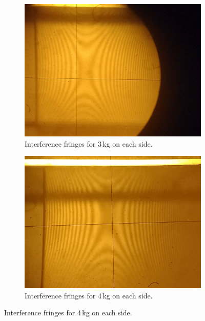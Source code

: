 \documentclass[a4paper,11pt]{article}
\begin{document}
\begin{figure}[H]
  \centering
  \begin{subfigure}[b]{0.45\textwidth}
    \centering
    \includegraphics[width=\textwidth]{3.jpg}
    \caption{Interference fringes for 3\,kg on each side.}
    \label{fig:fringes_3kg}
  \end{subfigure}
  \hfill
  \begin{subfigure}[b]{0.45\textwidth}
    \centering
    \includegraphics[width=\textwidth]{4.jpg}
    \caption{Interference fringes for 4\,kg on each side.}
    \label{fig:fringes_4kg}
  \end{subfigure}
  

\end{figure}
\end{document}
